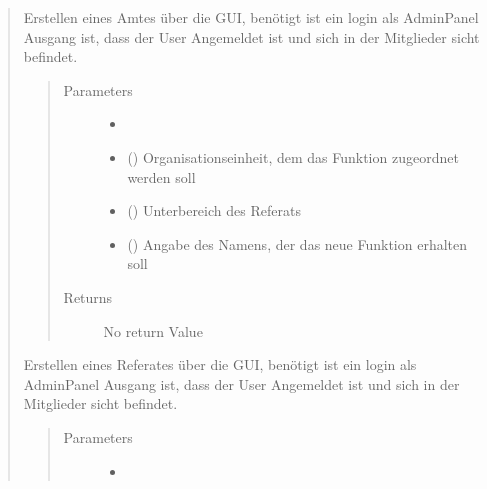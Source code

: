 \documentclass[letterpaper,10pt,english]{sphinxmanual}
\begin{document}
\begin{quote}
\begin{fulllineitems}
Erstellen eines Amtes über die GUI, benötigt ist ein login als AdminPanel
Ausgang ist, dass der User Angemeldet ist und sich in der Mitglieder sicht
befindet.
\begin{quote}\begin{description}
\item[{Parameters}] \leavevmode\begin{itemize}
\item {} 
 \textendash{} 

\item {} 
 () \textendash{} Organisationseinheit, dem das Funktion zugeordnet werden soll

\item {} 
 () \textendash{} Unterbereich des Referats

\item {} 
 () \textendash{} Angabe des Namens, der das neue Funktion erhalten soll

\end{itemize}

\item[{Returns}] \leavevmode
No return Value

\end{description}\end{quote}

\end{fulllineitems}



\begin{fulllineitems}
Erstellen eines Referates über die GUI, benötigt ist ein login als AdminPanel
Ausgang ist, dass der User Angemeldet ist und sich in der Mitglieder sicht
befindet.
\begin{quote}\begin{description}
\item[{Parameters}] \leavevmode\begin{itemize}
\item {} 
 \textendash{} 


\end{itemize}
\end{description}
\end{quote}
\end{fulllineitems}
\end{quote}
\end{document}
